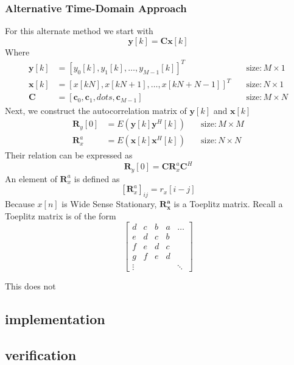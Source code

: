 \documentclass[report, oneside, a4paper, openany]{memoir}
\begin{document}
\subsubsection{Alternative Time-Domain Approach}
For this alternate method we start with 
$$
\mathbf{y}[k] = \mathbf{Cx}[k]
$$
Where 
\begin{equation*}
\begin{alignedat}{2}
\mathbf{y}[k] &= [y_0[k], y_1[k],\dots,y_{M-1}[k]]^T \quad &\text{size}: M \times 1\\
\mathbf{x}[k] &= [x[kN],x[kN+1],\dots, x[kN+N-1]]^T \quad &\text{size}: N \times 1\\
\mathbf{C} &= [\mathbf{c}_0,\mathbf{c}_1,dots,\mathbf{c}_{M-1}] \quad &\text{size}: M \times N
\end{alignedat}
\end{equation*}
Next, we construct the autocorrelation matrix of $\mathbf{y}[k]$ and $\mathbf{x}[k]$
\begin{equation*}
\begin{alignedat}{2}
\mathbf{R}_y[0] &= E(\mathbf{y}[k]\mathbf{y}^H[k]) \quad &\text{size}: M \times M \\
\mathbf{R}_x^a &= E(\mathbf{x}[k]\mathbf{x}^H[k]) \quad &\text{size}: N \times N
\end{alignedat}
\end{equation*}
Their relation can be expressed as
$$
\mathbf{R}_y[0] = \mathbf{CR}_x^a\mathbf{C}^H
$$
An element of $\mathbf{R}_x^a$ is defined as 
$$[\mathbf{R}_x^a]_{ij} = r_x[i-j]$$ 
Because $x[n]$ is Wide Sense Stationary, $\mathbf{R_x^a}$ is a Toeplitz matrix. 
Recall a Toeplitz matrix is of the form
$$
\begin{bmatrix}
d &c & b & a & \dots \\
e & d & c & b & ~ \\
f & e & d & c & ~ \\
g & f & e & d & ~ \\
\vdots & ~ & ~ & ~& \ddots
\end{bmatrix}
$$

This does not

\subsection{implementation}

\subsection{verification}
\end{document}
